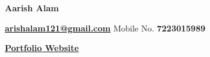 \documentclass{article}%
\begin{document}
\begin{flushleft}
\textbf{\Large{\huge Aarish Alam}}
\end{flushleft}
{\textbf{\href{mailto:arishalam121@gmail.com}{arishalam121@gmail.com}}}
\hfill{Mobile No. \textbf{7223015989}}

\begin{flushleft}
{\href{https://rheagalfire.github.io}{\textbf{Portfolio Website}}}\hfill
\begin{minipage}{0.4\textwidth}
\raggedleft
\href{https://github.com/RheagalFire}{\faGithub}\hspace{2mm}
\href{https://www.linkedin.com/in/aarish-alam/}{\faLinkedin}\hspace{2mm}
\href{https://arishalam121.medium.com/}{\faMedium}\hspace{2mm}
\href{https://www.kaggle.com/arishalam}{\faKaggle}
\end{minipage}
\end{flushleft}
\end{document}

